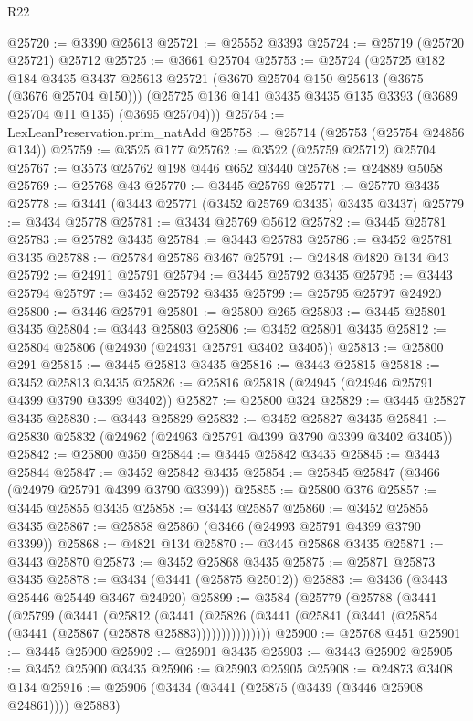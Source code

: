 \begin{lexlean}{R22}
\begin{coremodule}
@25720 := @3390 @25613
@25721 := @25552 @3393
@25724 := @25719 (@25720 @25721) @25712
@25725 := @3661 @25704
@25753 := @25724
    (@25725
      @182
      @184
      @3435
      @3437
      @25613
      @25721
      (@3670 @25704 @150 @25613 (@3675 (@3676 @25704 @150)))
      (@25725 @136 @141 @3435 @3435 @135 @3393 (@3689 @25704 @11 @135) (@3695 @25704)))
@25754 := LexLeanPreservation.prim_natAdd
@25758 := @25714 (@25753 (@25754 @24856 @134))
@25759 := @3525 @177
@25762 := @3522 (@25759 @25712) @25704
@25767 := @3573 @25762 @198 @446 @652 @3440
@25768 := @24889 @5058
@25769 := @25768 @43
@25770 := @3445 @25769
@25771 := @25770 @3435
@25778 := @3441 (@3443 @25771 (@3452 @25769 @3435) @3435 @3437)
@25779 := @3434 @25778
@25781 := @3434 @25769 @5612
@25782 := @3445 @25781
@25783 := @25782 @3435
@25784 := @3443 @25783
@25786 := @3452 @25781 @3435
@25788 := @25784 @25786 @3467
@25791 := @24848 @4820 @134 @43
@25792 := @24911 @25791
@25794 := @3445 @25792 @3435
@25795 := @3443 @25794
@25797 := @3452 @25792 @3435
@25799 := @25795 @25797 @24920
@25800 := @3446 @25791
@25801 := @25800 @265
@25803 := @3445 @25801 @3435
@25804 := @3443 @25803
@25806 := @3452 @25801 @3435
@25812 := @25804 @25806 (@24930 (@24931 @25791 @3402 @3405))
@25813 := @25800 @291
@25815 := @3445 @25813 @3435
@25816 := @3443 @25815
@25818 := @3452 @25813 @3435
@25826 := @25816 @25818 (@24945 (@24946 @25791 @4399 @3790 @3399 @3402))
@25827 := @25800 @324
@25829 := @3445 @25827 @3435
@25830 := @3443 @25829
@25832 := @3452 @25827 @3435
@25841 := @25830 @25832 (@24962 (@24963 @25791 @4399 @3790 @3399 @3402 @3405))
@25842 := @25800 @350
@25844 := @3445 @25842 @3435
@25845 := @3443 @25844
@25847 := @3452 @25842 @3435
@25854 := @25845 @25847 (@3466 (@24979 @25791 @4399 @3790 @3399))
@25855 := @25800 @376
@25857 := @3445 @25855 @3435
@25858 := @3443 @25857
@25860 := @3452 @25855 @3435
@25867 := @25858 @25860 (@3466 (@24993 @25791 @4399 @3790 @3399))
@25868 := @4821 @134
@25870 := @3445 @25868 @3435
@25871 := @3443 @25870
@25873 := @3452 @25868 @3435
@25875 := @25871 @25873 @3435
@25878 := @3434 (@3441 (@25875 @25012))
@25883 := @3436 (@3443 @25446 @25449 @3467 @24920)
@25899 := @3584
    (@25779
      (@25788
        (@3441
          (@25799
            (@3441
              (@25812
                (@3441
                  (@25826 (@3441 (@25841 (@3441 (@25854 (@3441 (@25867 (@25878 @25883)))))))))))))))
@25900 := @25768 @451
@25901 := @3445 @25900
@25902 := @25901 @3435
@25903 := @3443 @25902
@25905 := @3452 @25900 @3435
@25906 := @25903 @25905
@25908 := @24873 @3408 @134
@25916 := @25906 (@3434 (@3441 (@25875 (@3439 (@3446 @25908 @24861)))) @25883)

\end{coremodule}
\end{lexlean}
